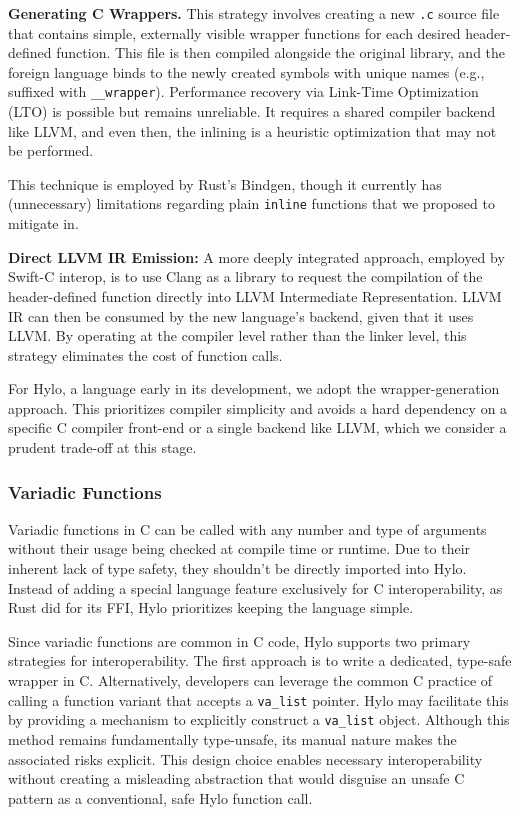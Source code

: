 \textbf{Generating C Wrappers.} This strategy involves creating a new \texttt{.c} source file that contains simple, externally visible wrapper functions for each desired header-defined function. This file is then compiled alongside the original library, and the foreign language binds to the newly created symbols with unique names (e.g., suffixed with \texttt{\_\_wrapper}). Performance recovery via Link-Time Optimization (LTO) is possible but remains unreliable. It requires a shared compiler backend like LLVM, and even then, the inlining is a heuristic optimization that may not be performed.

This technique is employed by Rust's Bindgen, though it currently has (unnecessary) limitations regarding plain \texttt{inline} functions\cite{bindgen-inline-limitation} that we proposed to mitigate in\cite{bindgen-inline-proposal}.

\textbf{Direct LLVM IR Emission:} A more deeply integrated approach, employed by Swift-C interop, is to use Clang as a library to request the compilation of the header-defined function directly into LLVM Intermediate Representation. LLVM IR can then be consumed by the new language's backend, given that it uses LLVM. By operating at the compiler level rather than the linker level, this strategy eliminates the cost of function calls.

For Hylo, a language early in its development, we adopt the wrapper-generation approach. This prioritizes compiler simplicity and avoids a hard dependency on a specific C compiler front-end or a single backend like LLVM, which we consider a prudent trade-off at this stage.


\subsubsection{Variadic Functions}
Variadic functions in C can be called with any number and type of arguments without their usage being checked at compile time or runtime. Due to their inherent lack of type safety, they shouldn't be directly imported into Hylo. Instead of adding a special language feature exclusively for C interoperability, as Rust did for its FFI\cite{rust-variadic-ffi}, Hylo prioritizes keeping the language simple.

Since variadic functions are common in C code, Hylo supports two primary strategies for interoperability. The first approach is to write a dedicated, type-safe wrapper in C. Alternatively, developers can leverage the common C practice of calling a function variant that accepts a \texttt{va\_list} pointer\cite{wrapping-valist}. Hylo may facilitate this by providing a mechanism to explicitly construct a \texttt{va\_list} object\cite{swift-variadic-ffi}. Although this method remains fundamentally type-unsafe, its manual nature makes the associated risks explicit. This design choice enables necessary interoperability without creating a misleading abstraction that would disguise an unsafe C pattern as a conventional, safe Hylo function call.

